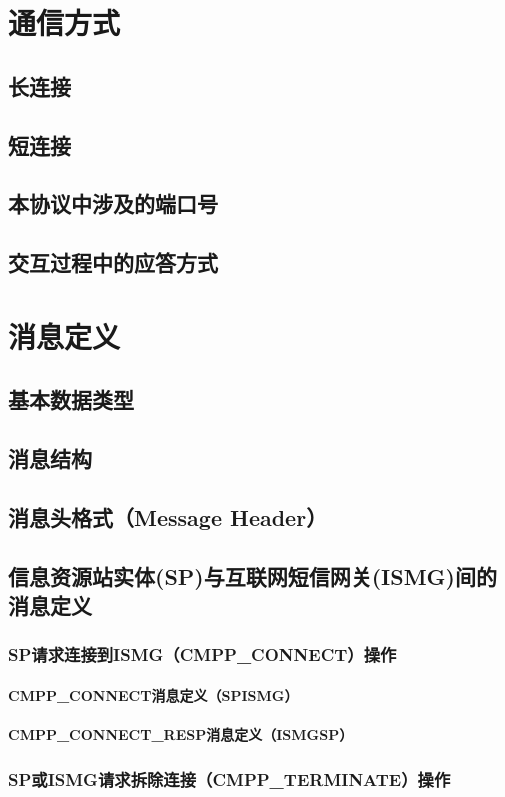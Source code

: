 \documentclass[11pt]{book} %
\begin{document}
\chapter{通信方式}
\section{长连接}
\section{短连接}
\section{本协议中涉及的端口号}
\section{交互过程中的应答方式}
\chapter{消息定义}
\section{基本数据类型}
\section{消息结构}
\section{消息头格式（Message Header）}
\section{信息资源站实体(SP)与互联网短信网关(ISMG)间的消息定义}
\subsection{SP请求连接到ISMG（CMPP\_CONNECT）操作	}
\subsubsection{CMPP\_CONNECT消息定义（SP\textrightarrow ISMG）}
\subsubsection{CMPP\_CONNECT\_RESP消息定义（ISMG\textrightarrow SP）}
\subsection{SP或ISMG请求拆除连接（CMPP\_TERMINATE）操作}
\end{document}

